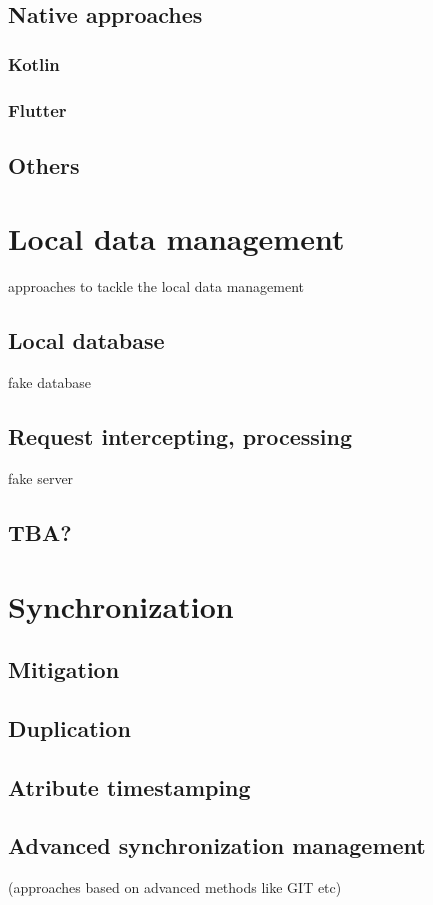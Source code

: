 \documentclass[
  digital,     %
  color,       %
  oneside,     %
  nosansbold,  %
  nocolorbold, %
  lof,         %
  lot,         %
]{fithesis4}
\begin{document}
\subsection{Native approaches}
\subsubsection{Kotlin}
\subsubsection{Flutter}
\subsection{Others}
\section{Local data management}
approaches to tackle the local data management
\subsection{Local database}
fake database
\subsection{Request intercepting, processing}
fake server
\subsection{TBA?}
\section{Synchronization}
\subsection{Mitigation}
\subsection{Duplication}
\subsection{Atribute timestamping}
\subsection{Advanced synchronization management}
(approaches based on advanced methods like GIT etc)
\end{document}

